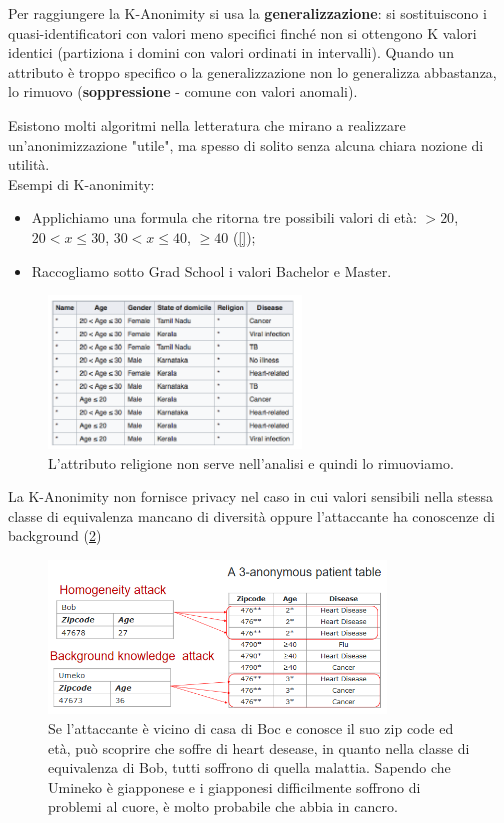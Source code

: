 \noindent Per raggiungere la K-Anonimity si usa la \textbf{generalizzazione}: si sostituiscono i quasi-identificatori con valori meno specifici finché non si ottengono K valori identici (partiziona i domini con valori ordinati in intervalli). Quando un attributo è troppo specifico o la generalizzazione non lo generalizza abbastanza, lo rimuovo (\textbf{soppressione} - comune con valori anomali). 

Esistono molti algoritmi nella letteratura che mirano a realizzare un'anonimizzazione "utile", ma spesso di solito senza alcuna chiara nozione di utilità.
\\

\noindent Esempi di K-anonimity: 
\begin{itemize}
    \item Applichiamo una formula che ritorna tre possibili valori di età: $>20$, $20<x\le30$, $30<x\le40$, $\ge40$ (\ref{});
    \item Raccogliamo sotto Grad School i valori Bachelor e Master.
\end{itemize}

\begin{figure}
    \centering
    \includegraphics[width=0.6\textwidth]{images/14-3.png}
    \caption{L'attributo religione non serve nell'analisi e quindi lo rimuoviamo.}
    \label{fig:14-3}
\end{figure}

\noindent La K-Anonimity non fornisce privacy nel caso in cui valori sensibili nella stessa classe di equivalenza mancano di diversità oppure l'attaccante ha conoscenze di background (\ref{fig:14-4}) 

\begin{figure}
    \centering
    \includegraphics[width=0.8\textwidth]{images/14-4.png}
    \caption{Se l'attaccante è vicino di casa di Boc e conosce il suo zip code ed età, può scoprire che soffre di heart desease, in quanto nella classe di equivalenza di Bob, tutti soffrono di quella malattia. Sapendo che Umineko è giapponese e i giapponesi difficilmente soffrono di problemi al cuore, è molto probabile che abbia in cancro.}
    \label{fig:14-4}
\end{figure}

